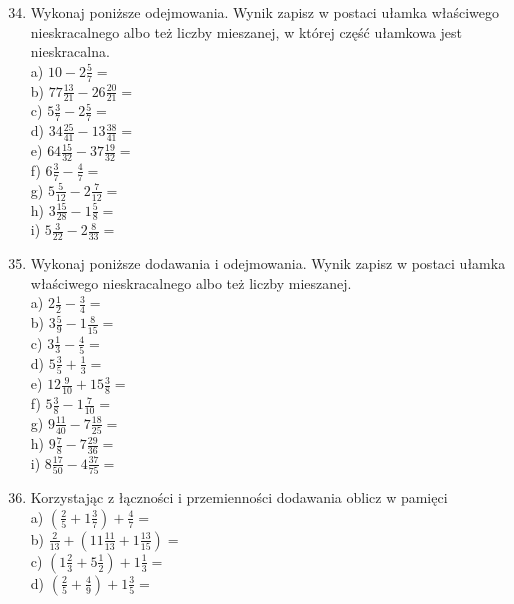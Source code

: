 \documentclass[10pt]{article}
\begin{document}
\begin{enumerate}
  \setcounter{enumi}{33}
  \item Wykonaj poniższe odejmowania. Wynik zapisz w postaci ułamka właściwego nieskracalnego albo też liczby mieszanej, w której część ułamkowa jest nieskracalna.\\
a) \(10-2 \frac{5}{7}=\)\\
b) \(77 \frac{13}{21}-26 \frac{20}{21}=\)\\
c) \(5 \frac{3}{7}-2 \frac{5}{7}=\)\\
d) \(34 \frac{25}{41}-13 \frac{38}{41}=\)\\
e) \(64 \frac{15}{32}-37 \frac{19}{32}=\)\\
f) \(6 \frac{3}{7}-\frac{4}{7}=\)\\
g) \(5 \frac{5}{12}-2 \frac{7}{12}=\)\\
h) \(3 \frac{15}{28}-1 \frac{5}{8}=\)\\
i) \(5 \frac{3}{22}-2 \frac{8}{33}=\)
  \item Wykonaj poniższe dodawania i odejmowania. Wynik zapisz w postaci ułamka właściwego nieskracalnego albo też liczby mieszanej.\\
a) \(2 \frac{1}{2}-\frac{3}{4}=\)\\
b) \(3 \frac{5}{9}-1 \frac{8}{15}=\)\\
c) \(3 \frac{1}{3}-\frac{4}{5}=\)\\
d) \(5 \frac{3}{5}+\frac{1}{3}=\)\\
e) \(12 \frac{9}{10}+15 \frac{3}{8}=\)\\
f) \(5 \frac{3}{8}-1 \frac{7}{10}=\)\\
g) \(9 \frac{11}{40}-7 \frac{18}{25}=\)\\
h) \(9 \frac{7}{8}-7 \frac{29}{36}=\)\\
i) \(8 \frac{17}{50}-4 \frac{37}{75}=\)
  \item Korzystając z łączności i przemienności dodawania oblicz w pamięci\\
a) \(\left(\frac{2}{5}+1 \frac{3}{7}\right)+\frac{4}{7}=\)\\
b) \(\frac{2}{13}+\left(11 \frac{11}{13}+1 \frac{13}{15}\right)=\)\\
c) \(\left(1 \frac{2}{3}+5 \frac{1}{2}\right)+1 \frac{1}{3}=\)\\
d) \(\left(\frac{2}{5}+\frac{4}{9}\right)+1 \frac{3}{5}=\)
\end{enumerate}
\end{document}

